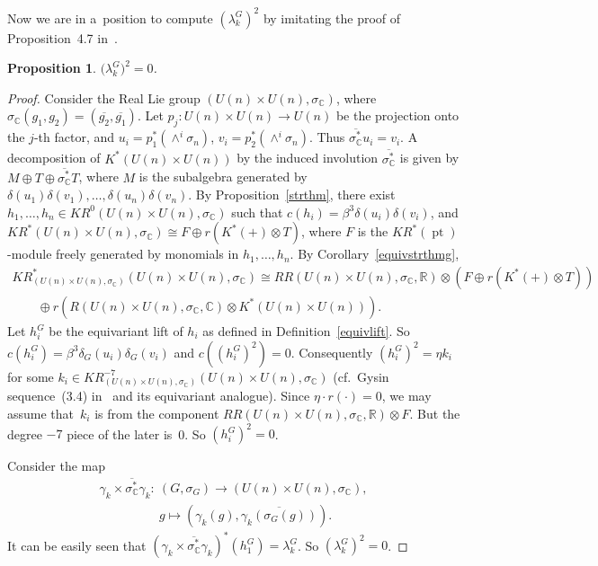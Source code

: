 \documentclass[11pt]{article}
\numberwithin{equation}{section}
\newtheorem{Proposition}[Theorem]{Proposition}
{\theoremstyle{definition}
\newtheorem{Definition}[Theorem]{Definition}
\newtheorem{Example}[Theorem]{Example}
\newtheorem{Remark}[Theorem]{Remark}
}
\DeclareMathOperator{\pt}{pt}
\begin{document}
Now we are in a~position to compute $(\lambda_k^G)^2$ by imitating the proof of Proposition~4.7 in~\cite{Se}.
\begin{Proposition}
\label{cplxsquare}
$\big(\lambda_k^G\big)^2=0$.
\end{Proposition}
\begin{proof}
Consider the Real Lie group $(U(n)\times U(n),
\sigma_\mathbb{C})$, where $\sigma_\mathbb{C}
(g_1, g_2)=(\overline{g_2}, \overline{g_1})$.
Let $p_j: U(n)\times U(n)\to U(n)$ be the projection onto the $j$-th factor, and $u_i=p_1^*(\wedge^i
\sigma_n)$, $v_i=p_2^*(\wedge^i\sigma_n)$.
Thus $\overline{\sigma_\mathbb{C}^*}u_i=v_i$.
A decomposition of $K^*(U(n)\times U(n))$ by the induced involution $\overline{\sigma_\mathbb{C}^*}$ is given by $M\oplus T\oplus \overline{\sigma_\mathbb{C}^*}T$, where $M$ is the subalgebra generated by $\delta(u_1)\delta(v_1), \dots, \delta(u_n)\delta(v_n)$.
By Proposition~\ref{strthm}, there exist $h_1, \dots, h_n\in KR^0(U(n)\times U(n),
\sigma_\mathbb{C})$ such that $c(h_i)=\beta^3\delta(u_i)\delta(v_i)$, and $KR^*(U(n)\times U(n),
\sigma_\mathbb{C})\cong F\oplus r(K^*(+)\otimes T)$, where $F$ is the $KR^*(\pt)$-module freely generated by monomials in $h_1,
\dots, h_n$.
By Corollary~\ref{equivstrthmg},
\begin{gather*}
KR^*_{(U(n)\times U(n),
\sigma_\mathbb{C})}(U(n)\times U(n),
\sigma_\mathbb{C})
\cong
RR(U(n)\times U(n),
\sigma_\mathbb{C}, \mathbb{R})\otimes(F\oplus r(K^*(+)\otimes T))
\\
\qquad{}
\oplus
r(R(U(n)\times U(n),
\sigma_\mathbb{C}, \mathbb{C})\otimes K^*(U(n)\times U(n))).
\end{gather*}
Let $h_i^G$ be the equivariant lift of $h_i$ as def\/ined in Def\/inition~\ref{equivlift}.
So $c(h_i^G)=\beta^3\delta_G(u_i)\delta_G(v_i)$ and $c((h_i^G)^2)=0$.
Consequently $(h_i^G)^2=\eta k_i$ for some $k_i\in KR^{-7}_{(U(n)\times U(n),
\sigma_\mathbb{C})}(U(n)\times U(n),
\sigma_\mathbb{C})$ (cf.\ Gysin sequence~(3.4) in~\cite{At3} and its equivariant analogue).
Since $\eta\cdot r(\cdot)=0$, we may assume that~$k_i$ is from the component $RR(U(n)\times U(n),
\sigma_\mathbb{C}, \mathbb{R})\otimes F$.
But the degree $-7$ piece of the later is~0.
So $(h_i^G)^2=0$.

Consider the map
\begin{gather*}
\gamma_k\times \overline{\sigma_\mathbb{C}^*}\gamma_k: \ (G,\sigma_G)  \to (U(n)\times U(n), \sigma_\mathbb{C}),
\\
\phantom{\gamma_k\times \overline{\sigma_\mathbb{C}^*}\gamma_k: {}} \
g  \mapsto  (\gamma_k(g), \overline{\gamma_k(\sigma_G(g))}).
\end{gather*}
It can be easily seen that $(\gamma_k\times\overline{\sigma_\mathbb{C}^*}\gamma_k)^*(h_1^G)=\lambda_k^G$.
So $(\lambda_k^G)^2=0$.
\end{proof}
\end{document}
